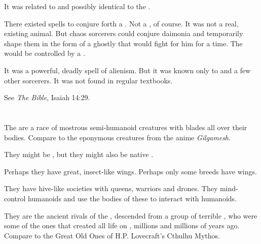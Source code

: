 It was related to and possibly identical to the . 

There existed spells to conjure forth a \malgryph.
Not a  \malgryph, of course. 
It was not a real, existing animal.
But chaos sorcerers could conjure daimonia and temporarily shape them in the form of a ghostly \malgryph that would fight for him for a time.
The \malgryph would be controlled by a \homunculus. 

It was a powerful, deadly spell of alienism.
But it was known only to \dragons and a few other sorcerers.
It was not found in regular \rethyactic textbooks.

See \emph{The Bible}, Isaiah 14:29.















\section{\NerasKirishgaith}
The \NerasKirishgaith{} are a race of mostrous semi-humanoid creatures with blades all over their bodies. Compare to the eponymous creatures from the anime \emph{Gilgamesh}. 

They might be \banes, but they might also be native \Miithians. 

Perhaps they have great, insect-like wings. Perhaps only some breeds have wings. 

They have hive-like societies with queens, warriors and drones. They mind-control humanoids and use the bodies of these to interact with humanoids. 

They are the ancient rivals of the \ophidians, descended from a group of terrible , who were some of the ones that created all life on \Miith{}, millions and millions of years ago. Compare to the Great Old Ones of H.P. Lovecraft's Cthulhu Mythos.














